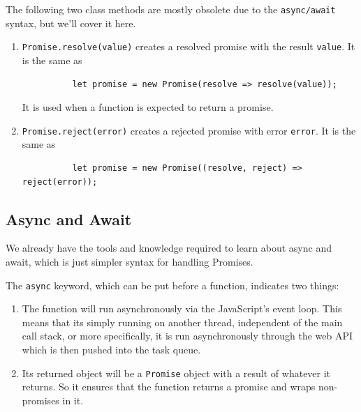 \documentclass{article}
\begin{document}
    \begin{definition}
      The following two class methods are mostly obsolete due to the \texttt{async/await} syntax, but we'll cover it here. 
      \begin{enumerate}
        \item \texttt{Promise.resolve(value)} creates a resolved promise with the result \texttt{value}. It is the same as 
        \begin{lstlisting}
          let promise = new Promise(resolve => resolve(value));
        \end{lstlisting}
        It is used when a function is expected to return a promise.

        \item \texttt{Promise.reject(error)} creates a rejected promise with error \texttt{error}. It is the same as 
        \begin{lstlisting}
          let promise = new Promise((resolve, reject) => reject(error));
        \end{lstlisting}
      \end{enumerate}
    \end{definition}

  \subsection{Async and Await}

    We already have the tools and knowledge required to learn about async and await, which is just simpler syntax for handling Promises. 

    \begin{definition}
      The \texttt{async} keyword, which can be put before a function, indicates two things: 
      \begin{enumerate}
        \item The function will run asynchronously via the JavaScript's event loop. This means that its simply running on another thread, independent of the main call stack, or more specifically, it is run asynchronously through the web API which is then pushed into the task queue.   
        \item Its returned object will be a \texttt{Promise} object with a result of whatever it returns. So it ensures that the function returns a promise and wraps non-promises in it. 
      \end{enumerate}
    \end{definition}
\end{document}
